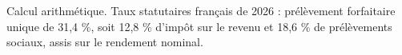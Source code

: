 Calcul arithmétique. Taux statutaires français de 2026 : prélèvement forfaitaire unique de 31,4 \%, soit 12,8 \% d'impôt sur le revenu et 18,6 \% de prélèvements sociaux, assis sur le rendement nominal.
